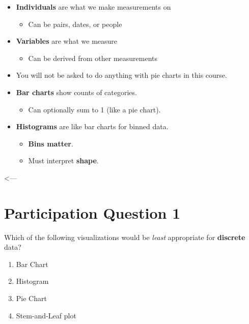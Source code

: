 \documentclass[
  letterpaper,
  DIV=11,
  numbers=noendperiod]{scrreprt}
\providecommand{\tightlist}{%
  \setlength{\itemsep}{0pt}\setlength{\parskip}{0pt}}\usepackage{longtable,booktabs,array}
\begin{document}
\begin{itemize}
\tightlist
\item
  \textbf{Individuals} are what we make measurements on

  \begin{itemize}
  \tightlist
  \item
    Can be pairs, dates, or people\lspace
  \end{itemize}
\item
  \textbf{Variables} are what we measure

  \begin{itemize}
  \tightlist
  \item
    Can be derived from other measurements\lspace
  \end{itemize}
\item
  You will not be asked to do anything with pie charts in this
  course.\lspace
\item
  \textbf{Bar charts} show counts of categories.

  \begin{itemize}
  \tightlist
  \item
    Can optionally sum to 1 (like a pie chart).\lspace
  \end{itemize}
\item
  \textbf{Histograms} are like bar charts for binned data.

  \begin{itemize}
  \tightlist
  \item
    \textbf{Bins matter}.
  \item
    Must interpret \textbf{shape}.
  \end{itemize}
\end{itemize}

\textless---

\hypertarget{participation-question-1}{%
\section{Participation Question 1}\label{participation-question-1}}

Which of the following visualizations would be \emph{least} appropriate
for \textbf{discrete} data?

\pspace

\begin{enumerate}
\def\labelenumi{\arabic{enumi}.}
\tightlist
\item
  Bar Chart\lspace
\item
  Histogram\lspace
\item
  Pie Chart\lspace
\item
  Stem-and-Leaf plot
\end{enumerate}
\end{document}
